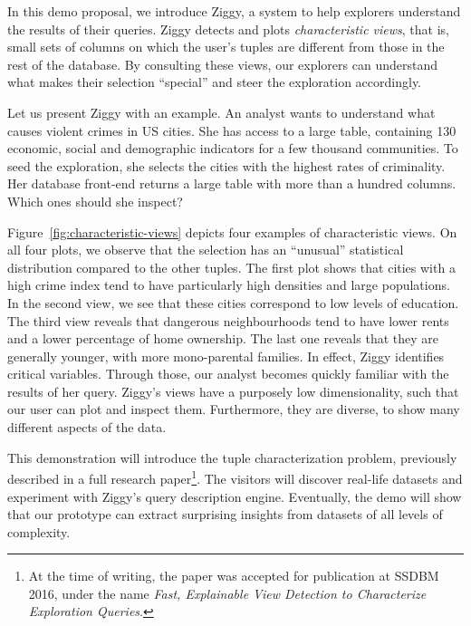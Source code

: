 In this demo proposal, we introduce Ziggy, a system to help explorers
understand the results of their queries.  Ziggy detects and plots
\emph{characteristic views}, that is, small sets of columns on which the user's
tuples are different from those in the rest of the database.  By consulting
these views, our explorers can understand what makes their selection
``special'' and steer the exploration accordingly. 

Let us present Ziggy with an example. An analyst wants to understand what
causes violent crimes in US cities. She has access to a large table, containing
130 economic, social and demographic indicators for a few thousand communities.
To seed the exploration, she selects the cities with the highest rates of
criminality. Her database front-end returns a large table with more than a
hundred columns. Which ones should she inspect?

Figure~\ref{fig:characteristic-views} depicts four examples of characteristic
views.  On all four plots, we observe that the selection has an ``unusual''
statistical distribution compared to the other tuples. The first plot shows
that cities with a high crime index tend to have particularly high densities
and large populations. In the second view, we see that these cities correspond
to low levels of education.  The third view reveals that dangerous
neighbourhoods tend to have lower rents and a lower percentage of home
ownership. The last one reveals that they are generally younger, with more
mono-parental families. In effect, Ziggy identifies critical variables.
Through those, our analyst becomes quickly familiar with the results of her query.
Ziggy's views have a purposely low dimensionality, such that our user can plot and
inspect them.  Furthermore, they are diverse, to show many different aspects of
the data.

This demonstration will introduce the tuple characterization problem,
previously described in a full research paper\footnote{At the time of writing,
the paper was accepted for publication at SSDBM 2016, under the name
\emph{Fast, Explainable View Detection to Characterize Exploration Queries}.}.
The visitors will discover real-life datasets and experiment with Ziggy's query
description engine.  Eventually, the demo will show that our prototype can
extract surprising insights from datasets of all levels of complexity.

